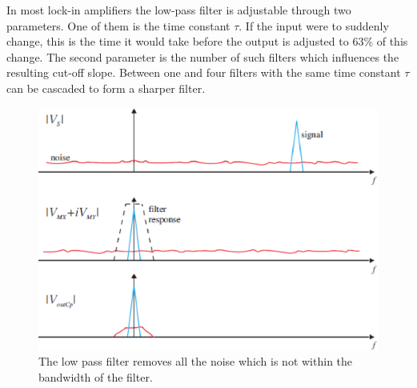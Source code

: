 In most lock-in amplifiers the low-pass filter is adjustable through two parameters. One of them is the time constant $\tau$. If the input were to suddenly change, this is the time it would take before the output is adjusted to 63\% of this change. The second parameter is the number of such filters which influences the resulting cut-off slope. Between one and four filters with the same time constant $\tau$ can be cascaded to form a sharper filter.

\begin{figure}[!hbt]\centering
\includegraphics[width=\linewidth, draft=\foto]{eps/lockin3.eps}
\caption{The low pass filter removes all the noise which is not within the bandwidth of the filter.}
\label{lockin3}
\end{figure}